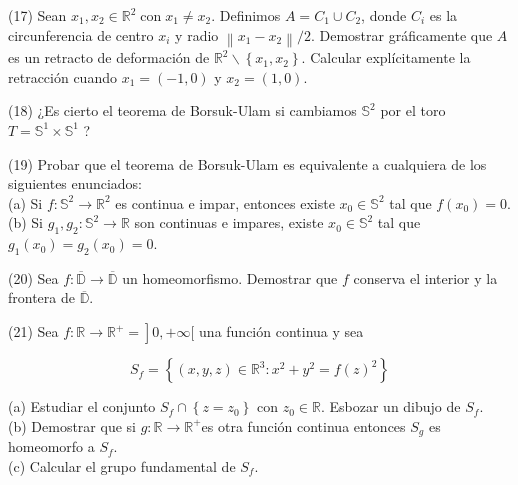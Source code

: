 \documentclass[
  a4paper,
  spanish,
  12pt,
]{scrartcl}
\begin{document}
\begin{ejer}
(17) Sean $x_{1}, x_{2} \in \mathbb{R}^{2} \operatorname{con} x_{1} \neq x_{2}$. Definimos $A=C_{1} \cup C_{2}$, donde $C_{i}$ es la circunferencia de centro $x_{i}$ y radio $\left\|x_{1}-x_{2}\right\| / 2$. Demostrar gráficamente que $A$ es un retracto de deformación de $\mathbb{R}^{2} \backslash\left\{x_{1}, x_{2}\right\}$. Calcular explícitamente la retracción cuando $x_{1}=(-1,0)$ y $x_{2}=(1,0)$.\\
\end{ejer}

\begin{ejer}
(18) ¿Es cierto el teorema de Borsuk-Ulam si cambiamos $\mathbb{S}^{2}$ por el toro $T=\mathbb{S}^{1} \times \mathbb{S}^{1}$ ?\\
\end{ejer}

\begin{ejer}
(19) Probar que el teorema de Borsuk-Ulam es equivalente a cualquiera de los siguientes enunciados:\\
(a) Si $f: \mathbb{S}^{2} \rightarrow \mathbb{R}^{2}$ es continua e impar, entonces existe $x_{0} \in \mathbb{S}^{2}$ tal que $f\left(x_{0}\right)=0$.\\
(b) Si $g_{1}, g_{2}: \mathbb{S}^{2} \rightarrow \mathbb{R}$ son continuas e impares, existe $x_{0} \in \mathbb{S}^{2}$ tal que $g_{1}\left(x_{0}\right)=g_{2}\left(x_{0}\right)=0$.\\
\end{ejer}

\begin{ejer}
(20) Sea $f: \overline{\mathbb{D}} \rightarrow \overline{\mathbb{D}}$ un homeomorfismo. Demostrar que $f$ conserva el interior y la frontera de $\overline{\mathbb{D}}$.\\
\end{ejer}

\begin{ejer}
(21) Sea $\left.f: \mathbb{R} \rightarrow \mathbb{R}^{+}=\right] 0,+\infty[$ una función continua y sea

$$
S_{f}=\left\{(x, y, z) \in \mathbb{R}^{3}: x^{2}+y^{2}=f(z)^{2}\right\}
$$

(a) Estudiar el conjunto $S_{f} \cap\left\{z=z_{0}\right\}$ con $z_{0} \in \mathbb{R}$. Esbozar un dibujo de $S_{f}$.\\
(b) Demostrar que si $g: \mathbb{R} \rightarrow \mathbb{R}^{+}$es otra función continua entonces $S_{g}$ es homeomorfo a $S_{f}$.\\
(c) Calcular el grupo fundamental de $S_{f}$.\\

\end{ejer}
\end{document}
